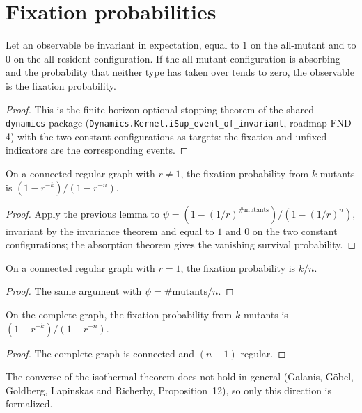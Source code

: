 \section{Fixation probabilities}
\begin{lemma}\label{lem:fixation-limit}
\leanok
Let an observable be invariant in expectation, equal to $1$ on the all-mutant and to $0$ on the
all-resident configuration. If the all-mutant configuration is absorbing and the probability
that neither type has taken over tends to zero, the observable is the fixation probability.
\end{lemma}
\begin{proof}\leanok
This is the finite-horizon optional stopping theorem of the shared \texttt{dynamics} package
(\texttt{Dynamics.Kernel.iSup\_event\_of\_invariant}, roadmap FND-4) with the two constant
configurations as targets: the fixation and unfixed indicators are the corresponding events.
\end{proof}
\begin{theorem}\label{thm:isothermal}
\leanok{}
On a connected regular graph with $r\neq1$, the fixation probability from $k$ mutants is
$(1-r^{-k})/(1-r^{-n})$.
\end{theorem}
\begin{proof}\leanok
Apply the previous lemma to $\psi=(1-(1/r)^{\#\text{mutants}})/(1-(1/r)^n)$, invariant by the
invariance theorem and equal to $1$ and $0$ on the two constant configurations; the
absorption theorem gives the vanishing survival probability.
\end{proof}
\begin{theorem}\label{thm:neutral}
\leanok{}
On a connected regular graph with $r=1$, the fixation probability is $k/n$.
\end{theorem}
\begin{proof}\leanok
The same argument with $\psi=\#\text{mutants}/n$.
\end{proof}
\begin{theorem}\label{thm:moran}
\leanok{}
On the complete graph, the fixation probability from $k$ mutants is $(1-r^{-k})/(1-r^{-n})$.
\end{theorem}
\begin{proof}\leanok
The complete graph is connected and $(n-1)$-regular.
\end{proof}
The converse of the isothermal theorem does not hold in general (Galanis, Göbel, Goldberg, Lapinskas and
Richerby, Proposition~12), so only this direction is formalized.

